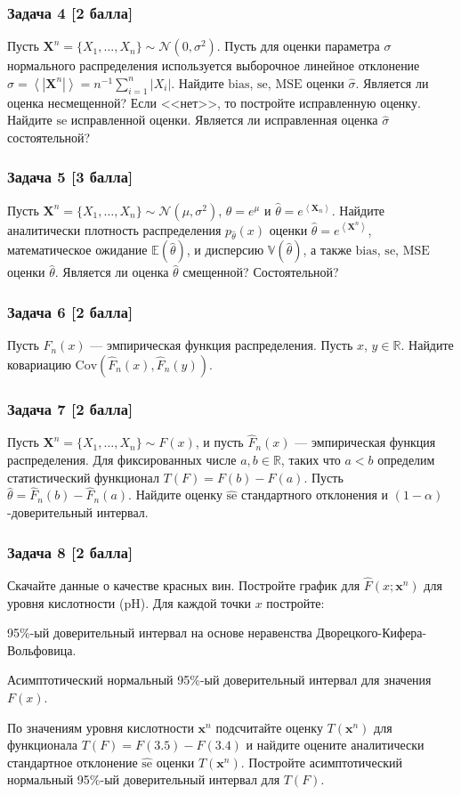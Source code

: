 \documentclass{article}
\newcommand{\RR}{\mathbb{R}}
\newcommand{\Var}{\mathbb{V}}
\newcommand{\Exp}{\mathbb{E}}
\newcommand{\Cov}{\text{Cov}}
\newcommand{\ecdf}{\hat{F}}
\newcommand{\Ecdf}[1]{\hat{F}_n(#1)}
\newcommand{\angmean}[1]{\left\langle #1 \right\rangle}
\newcommand{\esttheta}{\hat{\theta}}
\newcommand{\estsigma}{\hat{\sigma}}
\newcommand{\estSe}{\hat{\se}}
\newcommand{\boldX}{\boldsymbol{X}}
\newcommand{\boldx}{\boldsymbol{x}}
\newcommand{\Normal}{\mathcal{N}\xspace}
\newcommand{\bias}{\ensuremath{\mathrm{bias}\xspace}}
\newcommand{\se}{\ensuremath{\mathrm{se}\xspace}}
\newcommand{\MSE}{\ensuremath{\mathrm{MSE}\xspace}}
\renewenvironment{itemize}[1]{\begin{compactitem}#1}{\end{compactitem}}
\begin{document}
\subsubsection*{Задача 4 [2 балла]}
Пусть $\boldX^{n} = \{X_1, \dots, X_n\} \sim \Normal(0, \sigma^2)$. Пусть для оценки параметра $\sigma$ нормального распределения используется выборочное линейное отклонение $\estsigma = \angmean{|\boldX^{n}|} = n^{-1} \sum_{i=1}^{n} |X_i|$. Найдите $\bias$, $\se$, $\MSE$ оценки $\estsigma$. Является ли оценка несмещенной? Если <<нет>>, то постройте исправленную оценку. Найдите $\se$ исправленной оценки. Является ли исправленная оценка $\estsigma$ состоятельной? 

\subsubsection*{Задача 5 [3 балла]}
Пусть $\boldX^{n} = \{X_1,\ldots, X_n\} \sim \Normal(\mu, \sigma^2)$, $\theta = e^{\mu}$ и $\esttheta = e^{\angmean{\boldX_{n}}}$. Найдите аналитически плотность распределения $p_{\esttheta}(x)$ оценки $\esttheta = e^{\angmean{\boldX^{n}}}$, математическое ожидание $\Exp(\esttheta)$,  и дисперсию $\Var(\esttheta)$, а также $\bias$, $\se$, $\MSE$ оценки $\esttheta$. Является ли оценка $\esttheta$ смещенной? Состоятельной?

\subsubsection*{Задача 6 [2 балла]}
Пусть $\Ecdf{x}$ --- эмпирическая функция распределения. Пусть $x$, $y \in \RR$. Найдите ковариацию $\Cov(\Ecdf{x}, \Ecdf{y})$.

\subsubsection*{Задача 7 [2 балла]}
Пусть $\boldX^{n} = \{X_1, \dots, X_n\} \sim F(x)$, и пусть $\Ecdf{x}$ --- эмпирическая функция распределения. Для фиксированных числе $a, b\in \RR$, таких что $a < b$ определим статистический функционал $T(F) = F(b) - F(a)$. Пусть $\esttheta = \Ecdf{b} - \Ecdf{a}$. Найдите оценку $\estSe$ стандартного отклонения и $(1-\alpha)$-доверительный интервал.

\subsubsection*{Задача 8 [2 балла]}
Скачайте данные о качестве красных вин. Постройте график для $\ecdf(x;\boldx^n)$ для уровня кислотности (pH). Для каждой точки $x$ постройте:
\begin{itemize}
	\item 95\%-ый доверительный интервал на основе неравенства Дворецкого-Кифера-Вольфовица.
	\item Асимптотический нормальный 95\%-ый доверительный интервал для значения $F(x)$.
\end{itemize}
По значениям уровня кислотности $\boldx^n$ подсчитайте оценку $T(\boldx^n)$ для функционала $T(F) = F(3.5) - F(3.4)$ и найдите оцените аналитически стандартное отклонение $\estSe$ оценки $T(\boldx^n)$. Постройте асимптотический нормальный 95\%-ый доверительный интервал для $T(F)$.
	
\end{document}
